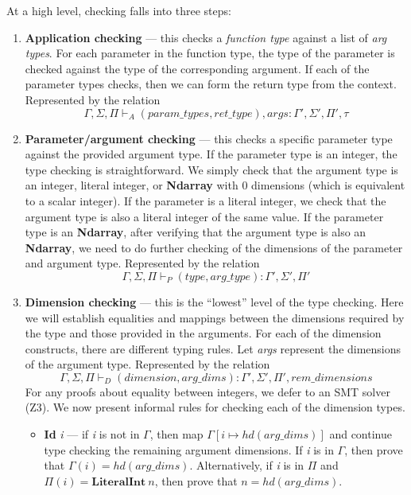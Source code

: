 \documentclass{report}
\begin{document}
At a high level, checking falls into three steps:
\begin{enumerate}[label=\arabic*.]
    \item \textbf{Application checking} --- this checks a \textit{function type} against a list of \textit{arg types}. For each parameter in the function type, the type of the parameter is checked against the type of the corresponding argument. If each of the parameter types checks, then we can form the return type from the context. Represented by the relation
    $$\Gamma, \Sigma, \Pi \vdash_{A} (param\_types, ret\_type), args : \Gamma', \Sigma', \Pi', \tau$$

    \item \textbf{Parameter/argument checking} --- this checks a specific parameter type against the provided argument type. If the parameter type is an integer, the type checking is straightforward. We simply check that the argument type is an integer, literal integer, or \textbf{Ndarray} with 0 dimensions (which is equivalent to a scalar integer). If the parameter is a literal integer, we check that the argument type is also a literal integer of the same value. If the parameter type is an \textbf{Ndarray}, after verifying that the argument type is also an \textbf{Ndarray}, we need to do further checking of the dimensions of the parameter and argument type. Represented by the relation
    $$\Gamma, \Sigma, \Pi \vdash_{P} (type, arg\_type) : \Gamma', \Sigma', \Pi'$$


    \item \textbf{Dimension checking} --- this is the ``lowest'' level of the type checking. Here we will establish equalities and mappings between the dimensions required by the type and those provided in the arguments. For each of the dimension constructs, there are different typing rules. Let \textit{args} represent the dimensions of the argument type. Represented by the relation
    $$\Gamma, \Sigma, \Pi \vdash_{D} (dimension, arg\_dims) : \Gamma', \Sigma', \Pi', rem\_dimensions$$
    For any proofs about equality between integers, we defer to an SMT solver (Z3). We now present informal rules for checking each of the dimension types.

    \begin{itemize}
        \item \textbf{Id} \textit{i} --- if \textit{i} is not in $\Gamma$, then map $\Gamma[i \mapsto hd(arg\_dims)]$ and continue type checking the remaining argument dimensions. If \textit{i} is in $\Gamma$, then prove that $\Gamma(i) = hd(arg\_dims)$. Alternatively, if \textit{i} is in $\Pi$ and $\Pi(i) = \textbf{LiteralInt}~n$, then prove that $n = hd(arg\_dims)$.


\end{itemize}
\end{enumerate}
\end{document}
